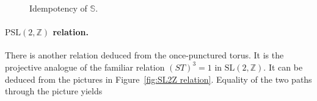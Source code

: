 \documentclass[12pt,a4paper]{article}
\newcommand\ZZ{\mathbb{Z}}
\newcommand\PSL{\text{PSL}}
\newcommand\SL{\text{SL}}
\begin{document}
\begin{figure}[ht]
    	\caption{Idempotency of $\mathbb{S}$.}
     \label{fig:idempotency S}
\end{figure}

\paragraph{$\PSL(2,\ZZ)$ relation.}
There is another relation deduced from the once-punctured torus. It is the projective analogue of the familiar relation $(ST)^3=1$ in $\SL(2,\ZZ)$. It can be deduced from the pictures in Figure~\ref{fig:SL2Z relation}. Equality of the two paths through the picture yields
\end{document}
